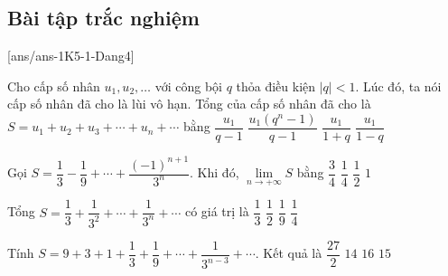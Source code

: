 \subsection*{Bài tập trắc nghiệm}
[ans/ans-1K5-1-Dang4]
\begin{ex}%
	Cho cấp số nhân $u_1,u_2,\ldots$ với công bội $q$ thỏa điều kiện $|q|<1$. Lúc đó, ta nói cấp số nhân đã cho là lùi vô hạn. Tổng của cấp số nhân đã cho là $S=u_1+u_2+u_3+\cdots +u_n+\cdots$ bằng 
	\choice
	{$\dfrac{u_1}{q-1}$}
	{$\dfrac{u_1\left(q^n-1\right)}{q-1}$}
	{$\dfrac{u_1}{1+q}$}
	{\True $\dfrac{u_1}{1-q}$}
\end{ex}
\begin{ex}%
	Gọi $S=\dfrac{1}{3}-\dfrac{1}{9}+\cdots +\dfrac{(-1)^{n+1}}{3^n}$. Khi đó, $\lim \limits_{n \to +\infty}S$ bằng 
	\choice
	{$\dfrac{3}{4}$}
	{\True $\dfrac{1}{4}$}
	{$\dfrac{1}{2}$}
	{$1$}
\end{ex}
\begin{ex}%
	Tổng $S=\dfrac{1}{3}+\dfrac{1}{3^2}+\cdots +\dfrac{1}{3^n}+\cdots$ có giá trị là 
	\choice
	{$\dfrac{1}{3}$}
	{\True $\dfrac{1}{2}$}
	{$\dfrac{1}{9}$}
	{$\dfrac{1}{4}$}
\end{ex}
\begin{ex}%
	Tính $S=9+3+1+\dfrac{1}{3}+\dfrac{1}{9}+\cdots +\dfrac{1}{3^{n-3}}+\cdots$. Kết quả là 
	\choice
	{\True $\dfrac{27}{2}$}
	{$14$}
	{$16$}
	{$15$}
\end{ex}
